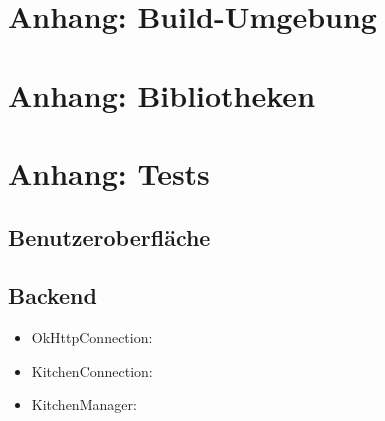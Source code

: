\documentclass{scrartcl}
\begin{document}
	\section{Anhang: Build-Umgebung} \label{build}
	
	\section{Anhang: Bibliotheken} \label{bib}

	\section{Anhang: Tests} \label{tests}
		\subsection{Benutzeroberfläche}
		
		\subsection{Backend}	
			\begin{itemize}
				\item OkHttpConnection: 
				\item KitchenConnection:
				\item KitchenManager:
			\end{itemize}
\end{document}
